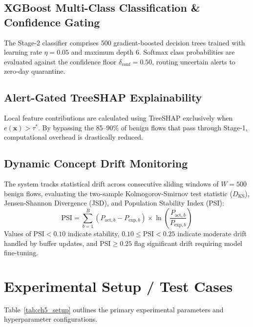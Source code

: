 \documentclass[12pt,a4paper]{report}
\begin{document}
\subsection{XGBoost Multi-Class Classification \& Confidence Gating}
The Stage-2 classifier comprises 500 gradient-boosted decision trees trained with learning rate $\eta = 0.05$ and maximum depth 6. Softmax class probabilities are evaluated against the confidence floor $\delta_{\text{conf}} = 0.50$, routing uncertain alerts to zero-day quarantine.

\subsection{Alert-Gated TreeSHAP Explainability}
Local feature contributions are calculated using TreeSHAP exclusively when $e(\mathbf{x}) > \tau^*$. By bypassing the 85--90\% of benign flows that pass through Stage-1, computational overhead is drastically reduced.

\subsection{Dynamic Concept Drift Monitoring}
The system tracks statistical drift across consecutive sliding windows of $W=500$ benign flows, evaluating the two-sample Kolmogorov-Smirnov test statistic ($D_{\text{KS}}$), Jensen-Shannon Divergence (JSD), and Population Stability Index (PSI):
\begin{equation}
\text{PSI} = \sum_{b=1}^B \left(P_{\text{act}, b} - P_{\text{exp}, b}\right) \times \ln\left(\frac{P_{\text{act}, b}}{P_{\text{exp}, b}}\right)
\label{eq:ch5_psi}
\end{equation}
Values of $\text{PSI} < 0.10$ indicate stability, $0.10 \le \text{PSI} < 0.25$ indicate moderate drift handled by buffer updates, and $\text{PSI} \ge 0.25$ flag significant drift requiring model fine-tuning.

\section{Experimental Setup / Test Cases}
Table~\ref{tab:ch5_setup} outlines the primary experimental parameters and hyperparameter configurations.
\end{document}
